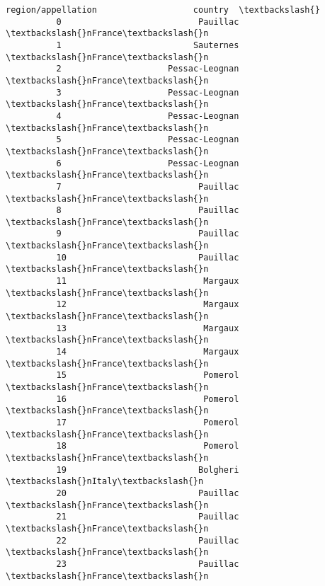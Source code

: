 \documentclass[11pt]{article}
\begin{document}
\begin{Verbatim}[commandchars=\\\{\}]
                            region/appellation                   country  \textbackslash{}
          0                           Pauillac                \textbackslash{}nFrance\textbackslash{}n   
          1                          Sauternes                \textbackslash{}nFrance\textbackslash{}n   
          2                     Pessac-Leognan                \textbackslash{}nFrance\textbackslash{}n   
          3                     Pessac-Leognan                \textbackslash{}nFrance\textbackslash{}n   
          4                     Pessac-Leognan                \textbackslash{}nFrance\textbackslash{}n   
          5                     Pessac-Leognan                \textbackslash{}nFrance\textbackslash{}n   
          6                     Pessac-Leognan                \textbackslash{}nFrance\textbackslash{}n   
          7                           Pauillac                \textbackslash{}nFrance\textbackslash{}n   
          8                           Pauillac                \textbackslash{}nFrance\textbackslash{}n   
          9                           Pauillac                \textbackslash{}nFrance\textbackslash{}n   
          10                          Pauillac                \textbackslash{}nFrance\textbackslash{}n   
          11                           Margaux                \textbackslash{}nFrance\textbackslash{}n   
          12                           Margaux                \textbackslash{}nFrance\textbackslash{}n   
          13                           Margaux                \textbackslash{}nFrance\textbackslash{}n   
          14                           Margaux                \textbackslash{}nFrance\textbackslash{}n   
          15                           Pomerol                \textbackslash{}nFrance\textbackslash{}n   
          16                           Pomerol                \textbackslash{}nFrance\textbackslash{}n   
          17                           Pomerol                \textbackslash{}nFrance\textbackslash{}n   
          18                           Pomerol                \textbackslash{}nFrance\textbackslash{}n   
          19                          Bolgheri                 \textbackslash{}nItaly\textbackslash{}n   
          20                          Pauillac                \textbackslash{}nFrance\textbackslash{}n   
          21                          Pauillac                \textbackslash{}nFrance\textbackslash{}n   
          22                          Pauillac                \textbackslash{}nFrance\textbackslash{}n   
          23                          Pauillac                \textbackslash{}nFrance\textbackslash{}n   

\end{Verbatim}
\end{document}
